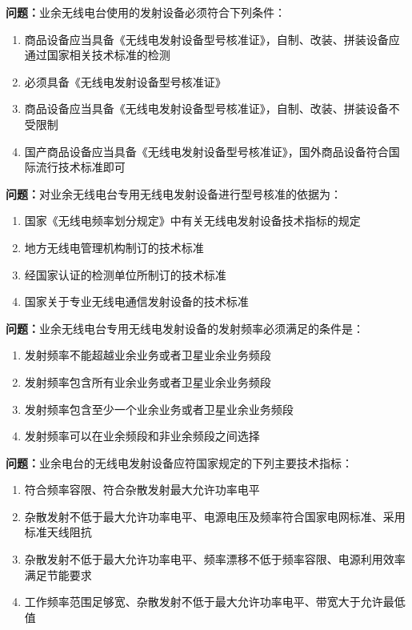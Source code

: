 \documentclass[UTF8]{ctexbook}
\begin{document}
\textbf{问题：}业余无线电台使用的发射设备必须符合下列条件：
\begin{enumerate}[label=\Alph*), leftmargin=3em]
  \item 商品设备应当具备《无线电发射设备型号核准证》，自制、改装、拼装设备应通过国家相关技术标准的检测
  \item 必须具备《无线电发射设备型号核准证》
  \item 商品设备应当具备《无线电发射设备型号核准证》，自制、改装、拼装设备不受限制
  \item 国产商品设备应当具备《无线电发射设备型号核准证》，国外商品设备符合国际流行技术标准即可
\end{enumerate}

\textbf{问题：}对业余无线电台专用无线电发射设备进行型号核准的依据为：
\begin{enumerate}[label=\Alph*), leftmargin=3em]
  \item 国家《无线电频率划分规定》中有关无线电发射设备技术指标的规定
  \item 地方无线电管理机构制订的技术标准
  \item 经国家认证的检测单位所制订的技术标准
  \item 国家关于专业无线电通信发射设备的技术标准
\end{enumerate}

\textbf{问题：}业余无线电台专用无线电发射设备的发射频率必须满足的条件是：
\begin{enumerate}[label=\Alph*), leftmargin=3em]
  \item 发射频率不能超越业余业务或者卫星业余业务频段
  \item 发射频率包含所有业余业务或者卫星业余业务频段
  \item 发射频率包含至少一个业余业务或者卫星业余业务频段
  \item 发射频率可以在业余频段和非业余频段之间选择
\end{enumerate}

\textbf{问题：}业余电台的无线电发射设备应符国家规定的下列主要技术指标：
\begin{enumerate}[label=\Alph*), leftmargin=3em]
  \item 符合频率容限、符合杂散发射最大允许功率电平
  \item 杂散发射不低于最大允许功率电平、电源电压及频率符合国家电网标准、采用标准天线阻抗
  \item 杂散发射不低于最大允许功率电平、频率漂移不低于频率容限、电源利用效率满足节能要求
  \item 工作频率范围足够宽、杂散发射不低于最大允许功率电平、带宽大于允许最低值
\end{enumerate}
\end{document}
